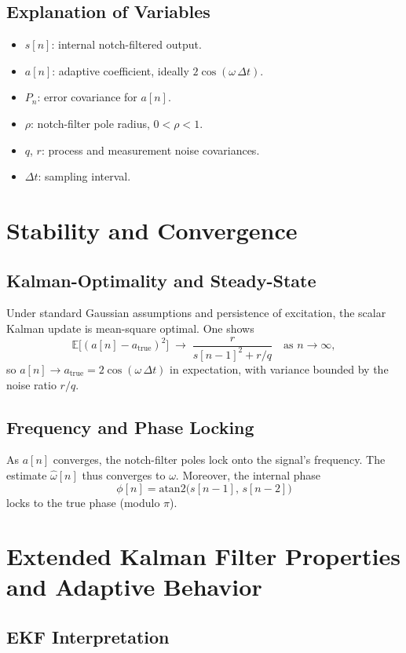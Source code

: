 \documentclass{article}
\begin{document}
\subsection{Explanation of Variables}
\begin{itemize}
  \item \(s[n]\): internal notch-filtered output.  
  \item \(a[n]\): adaptive coefficient, ideally \(2\cos(\omega\,\Delta t)\).  
  \item \(P_n\): error covariance for \(a[n]\).  
  \item \(\rho\): notch-filter pole radius, \(0<\rho<1\).  
  \item \(q\), \(r\): process and measurement noise covariances.  
  \item \(\Delta t\): sampling interval.  
\end{itemize}

\section{Stability and Convergence}

\subsection{Kalman-Optimality and Steady-State}
Under standard Gaussian assumptions and persistence of excitation, the scalar Kalman update is mean-square optimal.  One shows
\[
\mathbb{E}\bigl[(a[n] - a_{\mathrm{true}})^2\bigr]
\;\longrightarrow\;
\frac{r}{s[n-1]^2 + r/q}
\quad\text{as }n\to\infty,
\]
so \(a[n]\to a_{\mathrm{true}} = 2\cos(\omega\,\Delta t)\) in expectation, with variance bounded by the noise ratio \(r/q\).

\subsection{Frequency and Phase Locking}
As \(a[n]\) converges, the notch-filter poles lock onto the signal’s frequency.  The estimate \(\hat\omega[n]\) thus converges to \(\omega\).  Moreover, the internal phase
\[
\phi[n] = \mathrm{atan2}\bigl(s[n-1],\,s[n-2]\bigr)
\]
locks to the true phase (modulo \(\pi\)).

\section{Extended Kalman Filter Properties and Adaptive Behavior}

\subsection{EKF Interpretation}
\end{document}
